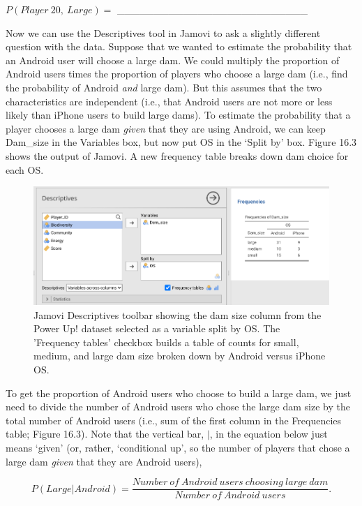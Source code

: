 \documentclass[
]{scrbook}
\begin{document}
\(P(Player\:20,\:Large) =\) \_\_\_\_\_\_\_\_\_\_\_\_\_\_\_\_\_\_\_\_\_\_\_\_\_\_

Now we can use the Descriptives tool in Jamovi to ask a slightly different question with the data.
Suppose that we wanted to estimate the probability that an Android user will choose a large dam.
We could multiply the proportion of Android users times the proportion of players who choose a large dam (i.e., find the probability of Android \emph{and} large dam).
But this assumes that the two characteristics are independent (i.e., that Android users are not more or less likely than iPhone users to build large dams).
To estimate the probability that a player chooses a large dam \emph{given} that they are using Android, we can keep Dam\_size in the Variables box, but now put OS in the `Split by' box.
Figure 16.3 shows the output of Jamovi.
A new frequency table breaks down dam choice for each OS.

\begin{figure}
\includegraphics[width=1\linewidth]{img/jamovi_power_up_frequencies2} \caption{Jamovi Descriptives toolbar showing the dam size column from the Power Up! dataset selected as a variable split by OS. The 'Frequency tables' checkbox builds a table of counts for small, medium, and large dam size broken down by Android versus iPhone OS.}\label{fig:unnamed-chunk-68}
\end{figure}

To get the proportion of Android users who choose to build a large dam, we just need to divide the number of Android users who chose the large dam size by the total number of Android users (i.e., sum of the first column in the Frequencies table; Figure 16.3).
Note that the vertical bar, \(|\), in the equation below just means `given' (or, rather, `conditional up', so the number of players that chose a large dam \emph{given} that they are Android users),

\[P(Large | Android) = \frac{Number\:of\:Android\:users\:choosing\:large\:dam}{Number\:of\:Android\:users}.\]
\end{document}
